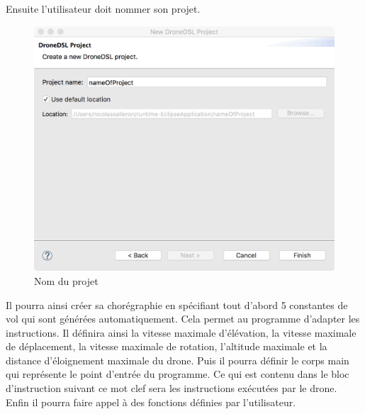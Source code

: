 \documentclass[12pt]{article}
\begin{document}
        Ensuite l'utilisateur doit nommer son projet.
        
        \begin{figure}[!h]
        \centering
        \includegraphics[scale=0.40]{06.png}
        \caption{Nom du projet}
        \end{figure}
        
        \newpage
        Il pourra ainsi créer sa chorégraphie en spécifiant tout d'abord 5 constantes de vol qui sont générées automatiquement. Cela permet au programme d'adapter les instructions. Il définira ainsi la vitesse maximale d'élévation, la vitesse maximale de déplacement, la vitesse maximale de rotation, l'altitude maximale et la distance d'éloignement maximale du drone. Puis il pourra définir le corps main qui représente le point d'entrée du programme. Ce qui est contenu dans le bloc d'instruction suivant ce mot clef sera les instructions exécutées par le drone. Enfin il pourra faire appel à des fonctions définies par l'utilisateur.
        
\end{document}
